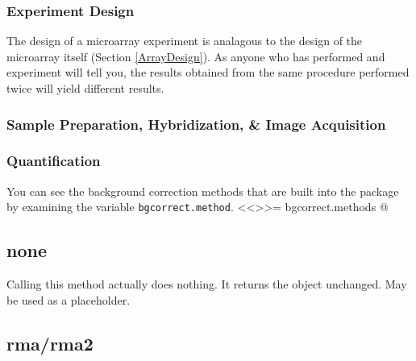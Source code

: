 \subsubsection{Experiment Design}
\label{ExperimentDesign}
The design of a microarray experiment is analagous to the design of the microarray itself (Section \ref{ArrayDesign}).  As anyone who has performed and experiment will tell you, the results obtained from the same procedure performed twice will yield different results.


\subsubsection{Sample Preparation, Hybridization, \& Image Acquisition}
\label{Hybridization}

\subsubsection{Quantification}
\label{Quantification}


You can see the background correction methods that are built into the package by examining the variable \verb+bgcorrect.method+.
<<>>=
bgcorrect.methods
@

\subsection{none}

Calling this method actually does nothing. It returns the object unchanged. May be used as a placeholder.

\subsection{rma/rma2}

